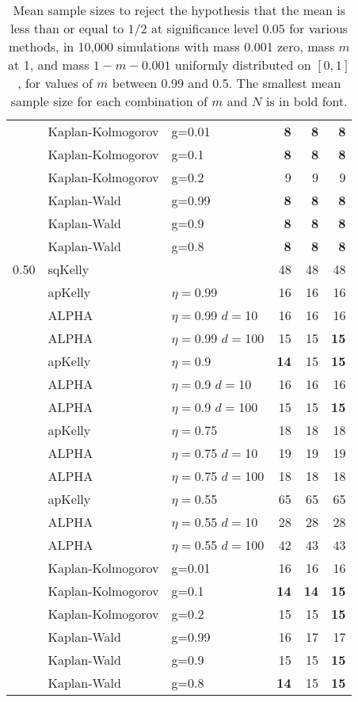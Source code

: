 \documentclass[aoas]{imsart}
\begin{document}
\begin{table}
\begin{tabular}{lll|rrr}
\cline{2-6}
 & Kaplan-Kolmogorov & g=0.01 & \bf{8}  & \bf{8}  & \bf{8}  \\
 & Kaplan-Kolmogorov & g=0.1 & \bf{8}  & \bf{8}  & \bf{8}  \\
 & Kaplan-Kolmogorov & g=0.2 & 9  & 9  & 9  \\
\cline{2-6}
 & Kaplan-Wald & g=0.99 & \bf{8}  & \bf{8}  & \bf{8}  \\
 & Kaplan-Wald & g=0.9 & \bf{8}  & \bf{8}  & \bf{8}  \\
 & Kaplan-Wald & g=0.8 & \bf{8}  & \bf{8}  & \bf{8}  \\
\hline 0.50 & sqKelly & & 48  & 48  & 48  \\
\cline{2-6} & apKelly & $\eta=$0.99 & 16  & 16  & 16  \\
\cline{2-6}
& ALPHA & $\eta=$0.99 $d=$10 & 16  & 16  & 16  \\
& ALPHA & $\eta=$0.99 $d=$100 & 15  & 15  & \bf{15}  \\
\cline{2-6} & apKelly & $\eta=$0.9 & \bf{14}  & 15  & \bf{15}  \\
\cline{2-6}
& ALPHA & $\eta=$0.9 $d=$10 & 16  & 16  & 16  \\
& ALPHA & $\eta=$0.9 $d=$100 & 15  & 15  & \bf{15}  \\
\cline{2-6} & apKelly & $\eta=$0.75 & 18  & 18  & 18  \\
\cline{2-6}
& ALPHA & $\eta=$0.75 $d=$10 & 19  & 19  & 19  \\
& ALPHA & $\eta=$0.75 $d=$100 & 18  & 18  & 18  \\
\cline{2-6} & apKelly & $\eta=$0.55 & 65  & 65  & 65  \\
\cline{2-6}
& ALPHA & $\eta=$0.55 $d=$10 & 28  & 28  & 28  \\
& ALPHA & $\eta=$0.55 $d=$100 & 42  & 43  & 43  \\
\cline{2-6}
 & Kaplan-Kolmogorov & g=0.01 & 16  & 16  & 16  \\
 & Kaplan-Kolmogorov & g=0.1 & \bf{14}  & \bf{14}  & \bf{15}  \\
 & Kaplan-Kolmogorov & g=0.2 & 15  & 15  & \bf{15}  \\
\cline{2-6}
 & Kaplan-Wald & g=0.99 & 16  & 17  & 17  \\
 & Kaplan-Wald & g=0.9 & 15  & 15  & \bf{15}  \\
 & Kaplan-Wald & g=0.8 & \bf{14}  & 15  & \bf{15}  
\end{tabular} 

\caption{\protect \label{tab:comparison-1} Mean sample sizes to reject the hypothesis that the mean is less than
or equal to $1/2$ at significance level $0.05$ for various methods, in 10,000  simulations with mass 0.001 zero, mass $m$ at 1, and mass $1-m-0.001$ uniformly  distributed on $[0, 1]$, for values of $m$ between 0.99 and 0.5. 
The smallest mean sample size for each combination of $m$ and $N$ is in bold font.
}
\end{table}
 
\end{document}
